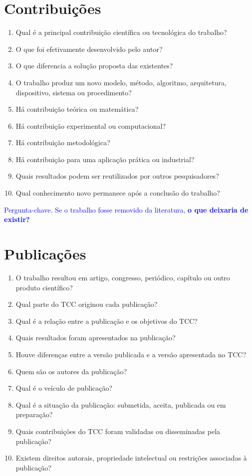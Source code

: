 \section{Contribuições}

\begin{enumerate}
	\item Qual é a principal contribuição científica ou tecnológica do trabalho?
	\item O que foi efetivamente desenvolvido pelo autor?
	\item O que diferencia a solução proposta das existentes?
	\item O trabalho produz um novo modelo, método, algoritmo, arquitetura, dispositivo, sistema ou procedimento?
	\item Há contribuição teórica ou matemática?
	\item Há contribuição experimental ou computacional?
	\item Há contribuição metodológica?
	\item Há contribuição para uma aplicação prática ou industrial?
	\item Quais resultados podem ser reutilizados por outros pesquisadores?
	\item Qual conhecimento novo permanece após a conclusão do trabalho?
\end{enumerate}

\textcolor{blue}{
Pergunta-chave.
Se o trabalho fosse removido da literatura, \textbf{o que deixaria de existir?}
}

\section{Publicações}

\begin{enumerate}
	\item O trabalho resultou em artigo, congresso, periódico, capítulo ou outro produto científico?
	\item Qual parte do TCC originou cada publicação?
	\item Qual é a relação entre a publicação e os objetivos do TCC?
	\item Quais resultados foram apresentados na publicação?
	\item Houve diferenças entre a versão publicada e a versão apresentada no TCC?
	\item Quem são os autores da publicação?
	\item Qual é o veículo de publicação?
	\item Qual é a situação da publicação: submetida, aceita, publicada ou em preparação?
	\item Quais contribuições do TCC foram validadas ou disseminadas pela publicação?
	\item Existem direitos autorais, propriedade intelectual ou restrições associadas à publicação?
\end{enumerate}

